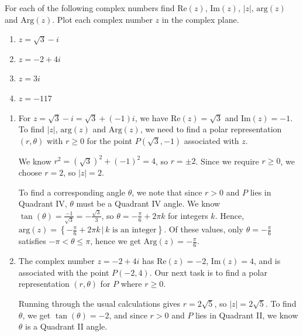 \documentclass{ximera}
\begin{document}
\begin{example} \label{plotmodargex}  For each of the following complex numbers find $\text{Re}(z)$, $\text{Im}(z)$, $|z|$, $\text{arg}(z)$ and $\text{Arg}(z)$.  Plot each complex number $z$ in the complex plane.

\begin{enumerate}

\item  $z = \sqrt{3}-i$

\item  $z = -2+4i$

\item  $z = 3i$

\item  $z = -117$

\end{enumerate}

\begin{explanation} 

\begin{enumerate}

\item For $z = \sqrt{3} -i = \sqrt{3} + (-1)i$, we have $\text{Re}(z) = \sqrt{3}$ and $\text{Im}(z) = -1$.    To find $|z|$, $\text{arg}(z)$ and $\text{Arg}(z)$, we need to find a polar representation $(r,\theta)$ with $r \geq 0$ for the point $P(\sqrt{3},-1)$ associated with $z$.   

 

We know $r^2 = (\sqrt{3})^2 + (-1)^2 = 4$, so $r = \pm 2$.  Since we require $r \geq 0$, we choose $r =2$, so $|z| = 2$.

 

To find a corresponding angle $\theta$, we note that since $r>0$ and $P$ lies in Quadrant IV, $\theta$ must be a Quadrant IV angle.  We know $\tan(\theta) = \frac{-1}{\sqrt{3}} = -\frac{\sqrt{3}}{3}$, so $\theta = -\frac{\pi}{6} + 2\pi k$ for integers $k$.  Hence, $\text{arg}(z) = \left\{-\frac{\pi}{6} + 2\pi k \, | \, \text{$k$ is an integer} \right\}$. Of these values, only  $\theta = -\frac{\pi}{6}$  satisfies  $-\pi < \theta \leq \pi$, hence we get $\text{Arg}(z) = -\frac{\pi}{6}$.  

\item The complex number $z = -2+4i$ has  $\text{Re}(z) = -2$,   $\text{Im}(z) = 4$, and is associated with the point $P(-2,4)$.  Our next task is to find a polar representation $(r,\theta)$ for $P$ where $r \geq 0$.

 

 Running through the usual calculations gives $r = 2\sqrt{5}$, so $|z| = 2\sqrt{5}$.  To find $\theta$, we get $\tan(\theta) = -2$, and since $r > 0$ and $P$ lies in Quadrant II, we know $\theta$  is a Quadrant II angle.  
 

\end{enumerate}
\end{explanation}
\end{example}
\end{document}
